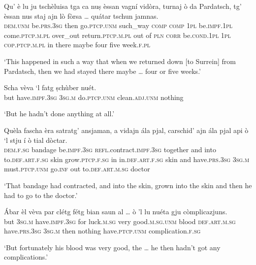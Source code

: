 \begin{linenumbers}
\gll  Qu' è lu ju tschèluisa tga ca nuṣ èssan vagní vidòra, turnaj ò da Pardatsch, tg' èssan nus staj ajn lò fòrsa … quátar tschun jamnas.  \\
 \textsc{dem.unm} be.\textsc{prs.3sg} then go.\textsc{ptcp.unm} such\_way \textsc{comp} \textsc{comp} \textsc{1pl} be.\textsc{impf.1pl} come.\textsc{ptcp.m.pl} over\_out return.\textsc{ptcp.m.pl} out of \textsc{pln} \textsc{corr} be.\textsc{cond.1pl} \textsc{1pl} \textsc{cop.ptcp.m.pl} in there maybe {} four five week.\textsc{f.pl}   \\
\end{linenumbers}
\medskip
\glt `This happened in such a way that when we returned down [to Surrein] from Pardatsch, then we had stayed there maybe … four or five weeks.'
\medskip

\begin{linenumbers}
\gll  Scha vèva `l fatg ṣchùber nuét.  \\
but have.\textsc{impf.3sg} \textsc{3sg.m} do.\textsc{ptcp.unm} clean.\textsc{adj.unm} nothing \\
\end{linenumbers}
\medskip
\glt `But he hadn’t done anything at all.'
\medskip

\begin{linenumbers}
\gll Quèla fascha èra satratg’ ansjaman, a vidajn ála pjal, carschid’ ajn ála pjal api ò `l stju í ò tial dòctar.  \\
\textsc{dem.f.sg} bandage be.\textsc{impf.3sg} \textsc{refl.}contract.\textsc{impf.3sg} together and into to.\textsc{def.art.f.sg} skin grow.\textsc{ptcp.f.sg} in in.\textsc{def.art.f.sg} skin and have.\textsc{prs.3sg} \textsc{3sg.m} must.\textsc{ptcp.unm} go.\textsc{inf} out to.\textsc{def.art.m.sg} doctor \\
\end{linenumbers}
\medskip
\glt `That bandage had contracted, and into the skin, grown into the skin and then he had to go to the doctor.'
\medskip

\begin{linenumbers}
\gll  Ábar èl vèva par clétg fétg bian saun al … ò 'l lu nuéta gju còmplicazjuns.  \\
but  \textsc{3sg.m} have.\textsc{impf.3sg} for luck.\textsc{m.sg} very good.\textsc{m.sg.unm} blood \textsc{def.art.m.sg} {} have.\textsc{prs.3sg} \textsc{3sg.m} then nothing have.\textsc{ptcp.unm} complication.\textsc{f.sg}\\
\end{linenumbers}
\medskip
\glt `But fortunately his blood was very good, the … he then hadn’t got any complications.'
\medskip

